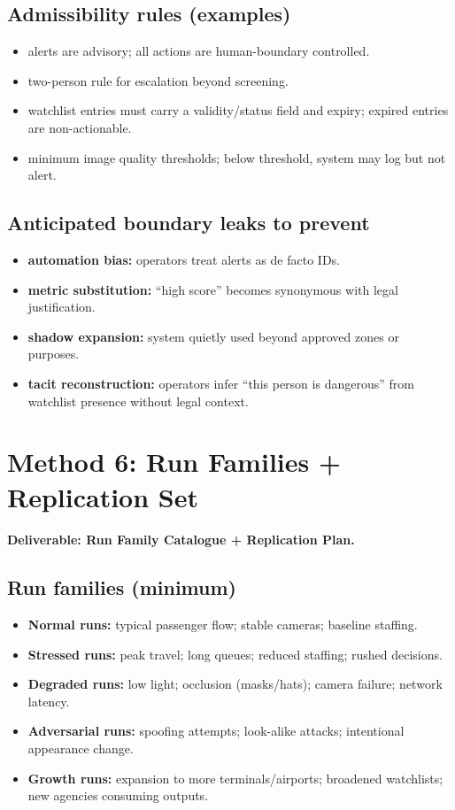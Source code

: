 \subsection*{Admissibility rules (examples)}
\begin{itemize}
  \item alerts are advisory; all actions are human-boundary controlled.
  \item two-person rule for escalation beyond screening.
  \item watchlist entries must carry a validity/status field and expiry; expired entries are non-actionable.
  \item minimum image quality thresholds; below threshold, system may log but not alert.
\end{itemize}

\subsection*{Anticipated boundary leaks to prevent}
\begin{itemize}
  \item \textbf{automation bias:} operators treat alerts as de facto IDs.
  \item \textbf{metric substitution:} “high score” becomes synonymous with legal justification.
  \item \textbf{shadow expansion:} system quietly used beyond approved zones or purposes.
  \item \textbf{tacit reconstruction:} operators infer “this person is dangerous” from watchlist presence without legal context.
\end{itemize}

\section{Method 6: Run Families + Replication Set}
\label{sec:airport-m6}

\paragraph{Deliverable: Run Family Catalogue + Replication Plan.}

\subsection*{Run families (minimum)}
\begin{itemize}
  \item \textbf{Normal runs:} typical passenger flow; stable cameras; baseline staffing.
  \item \textbf{Stressed runs:} peak travel; long queues; reduced staffing; rushed decisions.
  \item \textbf{Degraded runs:} low light; occlusion (masks/hats); camera failure; network latency.
  \item \textbf{Adversarial runs:} spoofing attempts; look-alike attacks; intentional appearance change.
  \item \textbf{Growth runs:} expansion to more terminals/airports; broadened watchlists; new agencies consuming outputs.
\end{itemize}

